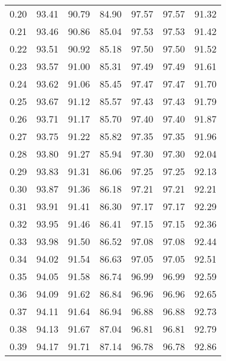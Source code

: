 \begin{tabular}{|c|c|c|c|c|c|c|}
      0.20 &     93.41 &     90.79 &      84.90 &   97.57 &      97.57 &         91.32 \\
      0.21 &     93.46 &     90.86 &      85.04 &   97.53 &      97.53 &         91.42 \\
      0.22 &     93.51 &     90.92 &      85.18 &   97.50 &      97.50 &         91.52 \\
      0.23 &     93.57 &     91.00 &      85.31 &   97.49 &      97.49 &         91.61 \\
      0.24 &     93.62 &     91.06 &      85.45 &   97.47 &      97.47 &         91.70 \\
      0.25 &     93.67 &     91.12 &      85.57 &   97.43 &      97.43 &         91.79 \\
      0.26 &     93.71 &     91.17 &      85.70 &   97.40 &      97.40 &         91.87 \\
      0.27 &     93.75 &     91.22 &      85.82 &   97.35 &      97.35 &         91.96 \\
      0.28 &     93.80 &     91.27 &      85.94 &   97.30 &      97.30 &         92.04 \\
      0.29 &     93.83 &     91.31 &      86.06 &   97.25 &      97.25 &         92.13 \\
      0.30 &     93.87 &     91.36 &      86.18 &   97.21 &      97.21 &         92.21 \\
      0.31 &     93.91 &     91.41 &      86.30 &   97.17 &      97.17 &         92.29 \\
      0.32 &     93.95 &     91.46 &      86.41 &   97.15 &      97.15 &         92.36 \\
      0.33 &     93.98 &     91.50 &      86.52 &   97.08 &      97.08 &         92.44 \\
      0.34 &     94.02 &     91.54 &      86.63 &   97.05 &      97.05 &         92.51 \\
      0.35 &     94.05 &     91.58 &      86.74 &   96.99 &      96.99 &         92.59 \\
      0.36 &     94.09 &     91.62 &      86.84 &   96.96 &      96.96 &         92.65 \\
      0.37 &     94.11 &     91.64 &      86.94 &   96.88 &      96.88 &         92.73 \\
      0.38 &     94.13 &     91.67 &      87.04 &   96.81 &      96.81 &         92.79 \\
      0.39 &     94.17 &     91.71 &      87.14 &   96.78 &      96.78 &         92.86 \\

\end{tabular}
